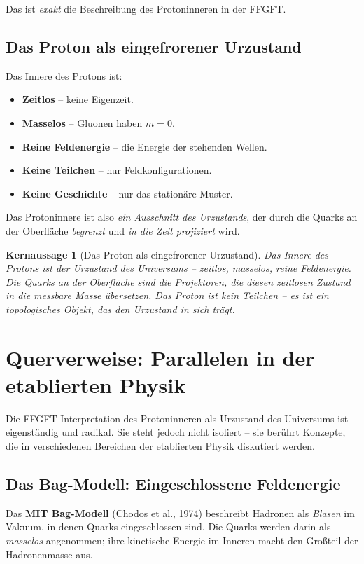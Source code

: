\documentclass[11pt,a4paper]{article}
\newtheorem{keyresult}{Kernaussage}
\begin{document}
	Das ist \emph{exakt} die Beschreibung des Protoninneren in der FFGFT.
	
	\subsection{Das Proton als eingefrorener Urzustand}
	
	Das Innere des Protons ist:
	\begin{itemize}
		\item \textbf{Zeitlos} -- keine Eigenzeit.
		\item \textbf{Masselos} -- Gluonen haben \(m = 0\).
		\item \textbf{Reine Feldenergie} -- die Energie der stehenden Wellen.
		\item \textbf{Keine Teilchen} -- nur Feldkonfigurationen.
		\item \textbf{Keine Geschichte} -- nur das stationäre Muster.
	\end{itemize}
	
	Das Protoninnere ist also \emph{ein Ausschnitt des Urzustands}, der durch die Quarks an der Oberfläche 
	\emph{begrenzt} und \emph{in die Zeit projiziert} wird.
	
	\begin{keyresult}[Das Proton als eingefrorener Urzustand]
		Das Innere des Protons ist der Urzustand des Universums -- zeitlos, masselos, reine Feldenergie. 
		Die Quarks an der Oberfläche sind die Projektoren, die diesen zeitlosen Zustand in die messbare Masse übersetzen. 
		Das Proton ist kein Teilchen -- es ist ein \emph{topologisches Objekt}, das den Urzustand in sich trägt.
	\end{keyresult}
	
	\section{Querverweise: Parallelen in der etablierten Physik}
	
	Die FFGFT-Interpretation des Protoninneren als Urzustand des Universums ist eigenständig und radikal. 
	Sie steht jedoch nicht isoliert -- sie berührt Konzepte, die in verschiedenen Bereichen der etablierten Physik diskutiert werden.
	
	\subsection{Das Bag-Modell: Eingeschlossene Feldenergie}
	
	Das \textbf{MIT Bag-Modell} (Chodos et al., 1974) beschreibt Hadronen als \emph{Blasen} im Vakuum, 
	in denen Quarks eingeschlossen sind. 
	Die Quarks werden darin als \emph{masselos} angenommen; ihre kinetische Energie im Inneren macht den Großteil der Hadronenmasse aus.
	
\end{document}
